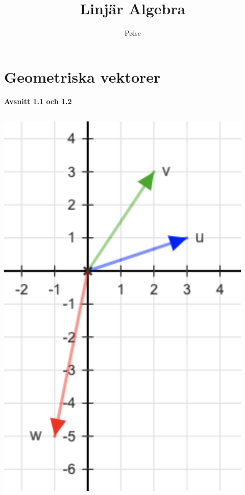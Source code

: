 \documentclass{article}
\title{Linjär Algebra}
\author{Pølse}
\begin{document}
\maketitle
\tableofcontents
\pagebreak
\section{Geometriska vektorer}
\textbf{Avsnitt 1.1 och 1.2}
\subsection{}
\includegraphics[scale=0.4]{uppg1_1}
\end{document}
